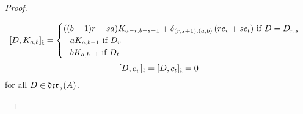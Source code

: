 \begin{proof}
\begin{enumerate}
                        $$[D, K_{a, b}]_{\hat{\mathfrak{t}}} =
                            \begin{cases}
                                \text{$((b - 1)r - sa) K_{a - r, b - s - 1} + \delta_{(r, s + 1), (a, b)} \left( r c_v + s c_t \right)$ if $D = D_{r, s}$}
                                \\
                                \text{$-a K_{a, b - 1}$ if $D_v$}
                                \\
                                \text{$-b K_{a, b - 1}$ if $D_t$}
                            \end{cases}
                        $$
                        $$[D, c_v]_{\hat{\mathfrak{t}}} = [D, c_t]_{\hat{\mathfrak{t}}} = 0$$
                    for all $D \in \mathfrak{der}_{\gamma}(A)$.
                    

\end{enumerate}
\end{proof}

